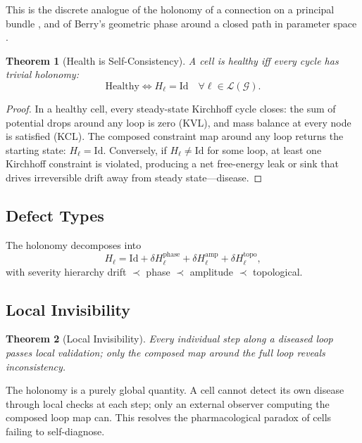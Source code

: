 \documentclass[twocolumn,10pt,a4paper]{article}
\newtheorem{theorem}{Theorem}[section]
\theoremstyle{definition}
\theoremstyle{remark}
\newcommand{\Gcond}{\mathcal{G}}
\newcommand{\Hol}{H}
\begin{document}
This is the discrete analogue of the holonomy of a connection on a principal bundle \citep{nakahara2003,baez_muniain_1994,hall2015}, and of Berry's geometric phase around a closed path in parameter space \citep{berry_1984}.

\begin{theorem}[Health is Self-Consistency]
\label{thm:health}
A cell is healthy iff every cycle has trivial holonomy:
\begin{equation}
    \text{Healthy} \iff \Hol_\ell = \mathrm{Id}\quad \forall\ell\in\mathcal{L}(\Gcond).
\end{equation}
\end{theorem}

\begin{proof}
In a healthy cell, every steady-state Kirchhoff cycle closes: the sum of potential drops around any loop is zero (KVL), and mass balance at every node is satisfied (KCL). The composed constraint map around any loop returns the starting state: $\Hol_\ell = \mathrm{Id}$. Conversely, if $\Hol_\ell \neq \mathrm{Id}$ for some loop, at least one Kirchhoff constraint is violated, producing a net free-energy leak or sink that drives irreversible drift away from steady state---disease.
\end{proof}

\subsection{Defect Types}

The holonomy decomposes into
\begin{equation}
    \Hol_\ell = \mathrm{Id} + \delta\Hol_\ell^{\mathrm{phase}} + \delta\Hol_\ell^{\mathrm{amp}} + \delta\Hol_\ell^{\mathrm{topo}},
\end{equation}
with severity hierarchy drift $\prec$ phase $\prec$ amplitude $\prec$ topological.

\subsection{Local Invisibility}

\begin{theorem}[Local Invisibility]
Every individual step along a diseased loop passes local validation; only the composed map around the full loop reveals inconsistency.
\end{theorem}

The holonomy is a purely global quantity. A cell cannot detect its own disease through local checks at each step; only an external observer computing the composed loop map can. This resolves the pharmacological paradox of cells failing to self-diagnose.
\end{document}
